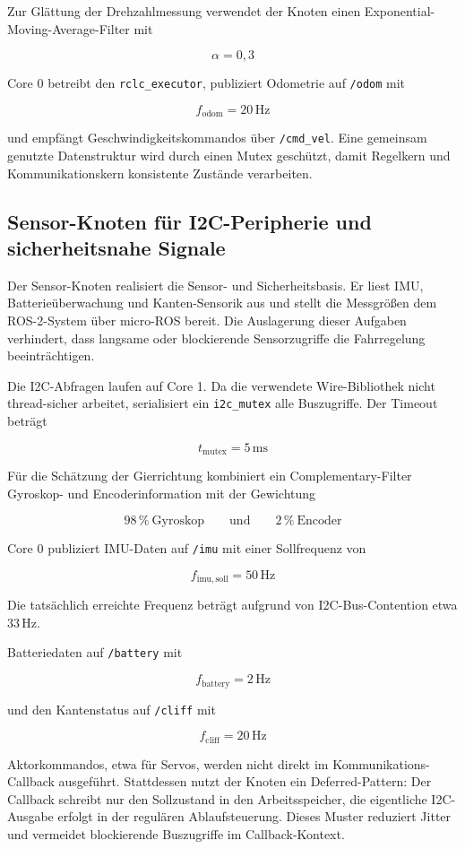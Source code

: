 Zur Glättung der Drehzahlmessung verwendet der Knoten einen Exponential-Moving-Average-Filter mit

$$\alpha = 0{,}3$$

Core 0 betreibt den \texttt{rclc\_executor}, publiziert Odometrie auf \texttt{/odom} mit

$$f_{\mathrm{odom}} = 20\,\mathrm{Hz}$$

und empfängt Geschwindigkeitskommandos über \texttt{/cmd\_vel}. Eine gemeinsam genutzte Datenstruktur wird durch einen Mutex geschützt, damit Regelkern und Kommunikationskern konsistente Zustände verarbeiten.

\subsection{Sensor-Knoten für I2C-Peripherie und sicherheitsnahe Signale}

Der Sensor-Knoten realisiert die Sensor- und Sicherheitsbasis. Er liest IMU, Batterieüberwachung und Kanten-Sensorik aus und stellt die Messgrößen dem ROS-2-System über micro-ROS bereit. Die Auslagerung dieser Aufgaben verhindert, dass langsame oder blockierende Sensorzugriffe die Fahrregelung beeinträchtigen.

Die I2C-Abfragen laufen auf Core 1. Da die verwendete Wire-Bibliothek nicht thread-sicher arbeitet, serialisiert ein \texttt{i2c\_mutex} alle Buszugriffe. Der Timeout beträgt

$$t_{\mathrm{mutex}} = 5\,\mathrm{ms}$$

Für die Schätzung der Gierrichtung kombiniert ein Complementary-Filter Gyroskop- und Encoderinformation mit der Gewichtung

$$98\,\%\ \text{Gyroskop} \qquad \text{und} \qquad 2\,\%\ \text{Encoder}$$

Core 0 publiziert IMU-Daten auf \texttt{/imu} mit einer Sollfrequenz von

$$f_{\mathrm{imu,soll}} = 50\,\mathrm{Hz}$$

Die tatsächlich erreichte Frequenz beträgt aufgrund von I2C-Bus-Contention etwa $33\,\mathrm{Hz}$.

Batteriedaten auf \texttt{/battery} mit

$$f_{\mathrm{battery}} = 2\,\mathrm{Hz}$$

und den Kantenstatus auf \texttt{/cliff} mit

$$f_{\mathrm{cliff}} = 20\,\mathrm{Hz}$$

Aktorkommandos, etwa für Servos, werden nicht direkt im Kommunikations-Callback ausgeführt. Stattdessen nutzt der Knoten ein Deferred-Pattern: Der Callback schreibt nur den Sollzustand in den Arbeitsspeicher, die eigentliche I2C-Ausgabe erfolgt in der regulären Ablaufsteuerung. Dieses Muster reduziert Jitter und vermeidet blockierende Buszugriffe im Callback-Kontext.


